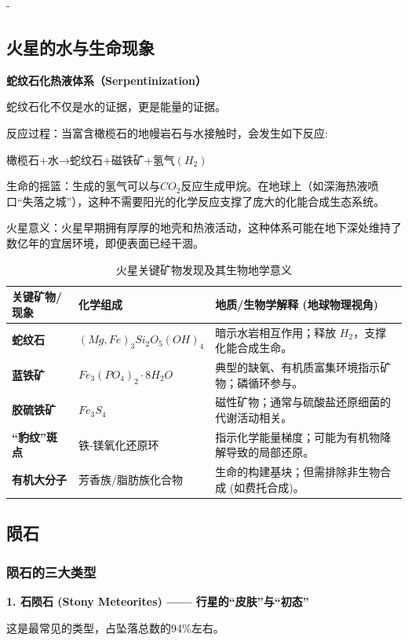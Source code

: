 \documentclass[12pt,a4paper]{article}
\begin{document}
	-
	\subsection{火星的水与生命现象}
		
	\textbf{蛇纹石化热液体系（Serpentinization）}
	
	蛇纹石化不仅是水的证据，更是能量的证据。
	
	反应过程：当富含橄榄石的地幔岩石与水接触时，会发生如下反应:
	
	橄榄石+水→蛇纹石+磁铁矿+氢气$(H_2)$
	
	生命的摇篮：生成的氢气可以与$CO_2$反应生成甲烷。在地球上（如深海热液喷口“失落之城”），这种不需要阳光的化学反应支撑了庞大的化能合成生态系统。
	
	火星意义：火星早期拥有厚厚的地壳和热液活动，这种体系可能在地下深处维持了数亿年的宜居环境，即便表面已经干涸。
	\begin{table}[htbp]
		\centering
		\caption{火星关键矿物发现及其生物地学意义}
		\begin{tabular}{lll}
			\toprule
			关键矿物/现象 & 化学组成 & 地质/生物学解释 (地球物理视角) \\
			\midrule
			\textbf{蛇纹石} & $(Mg,Fe)_3Si_2O_5(OH)_4$ & 暗示水岩相互作用；释放 $H_2$，支撑化能合成生命。 \\
			\addlinespace
			\textbf{蓝铁矿} & $Fe_3(PO_4)_2 \cdot 8H_2O$ & 典型的缺氧、有机质富集环境指示矿物；磷循环参与。 \\
			\addlinespace
			\textbf{胶硫铁矿} & $Fe_3S_4$ & 磁性矿物；通常与硫酸盐还原细菌的代谢活动相关。 \\
			\addlinespace
			\textbf{“豹纹”斑点} & 铁-镁氧化还原环 & 指示化学能量梯度；可能为有机物降解导致的局部还原。 \\
			\addlinespace
			\textbf{有机大分子} & 芳香族/脂肪族化合物 & 生命的构建基块；但需排除非生物合成 (如费托合成)。 \\
			\bottomrule
		\end{tabular}
	\end{table}
	
	\subsection{陨石}
	\subsubsection{陨石的三大类型}
	\textbf{1. 石陨石 (Stony Meteorites) —— 行星的“皮肤”与“初态”}
	
	这是最常见的类型，占坠落总数的94\%左右。
	
\end{document}
